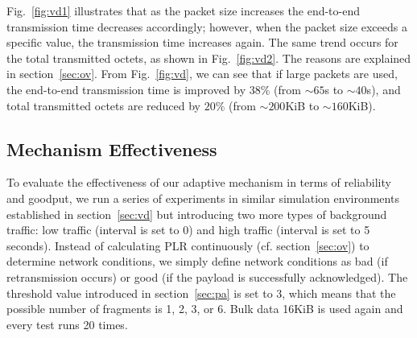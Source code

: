 \documentclass[runningheads,a4paper]{llncs}
\begin{document}
Fig.~\ref{fig:vd1} illustrates that as the packet size increases the end-to-end transmission time decreases accordingly; however, when the packet size exceeds a specific value, the transmission time increases again. The same trend occurs for the total transmitted octets, as shown in Fig.~\ref{fig:vd2}. The reasons are explained in section~\ref{sec:ov}. From Fig.~\ref{fig:vd}, we can see that if large packets are used, the end-to-end transmission time is improved by $38\%$ (from $\sim 65$s to $\sim 40$s), and total transmitted octets are reduced by $20\%$ (from $\sim 200$KiB to $\sim 160$KiB).

\subsection{Mechanism Effectiveness}
To evaluate the effectiveness of our adaptive mechanism in terms of reliability and goodput, we run a series of experiments in similar simulation environments established in section~\ref{sec:vd} but introducing two more types of background traffic: low traffic (interval is set to 0) and high traffic (interval is set to 5 seconds). Instead of calculating PLR continuously (cf. section~\ref{sec:ov}) to determine network conditions, we simply define network conditions as bad (if retransmission occurs) or good (if the payload is successfully acknowledged). The threshold value introduced in section~\ref{sec:pa} is set to 3, which means that the possible number of fragments is 1, 2, 3, or 6. Bulk data 16KiB is used again and every test runs 20 times.
\end{document}
